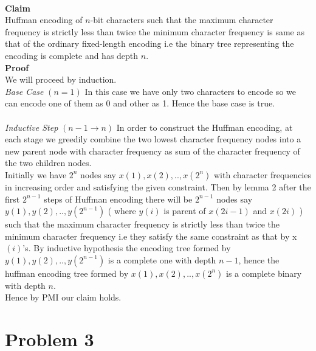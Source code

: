 \documentclass[a4paper]{article}
\begin{document}
\\
\textbf{Claim} \\ Huffman encoding of $n$-bit characters such that the maximum character frequency is strictly less than twice the minimum character frequency is same as that of the ordinary fixed-length encoding i.e the binary tree representing the encoding is complete and has depth $n$. \\
\textbf{Proof} \\
We will proceed by induction. \\
\emph{Base Case} $\left(n=1 \right)$
In this case we have only two characters to encode so we can encode one of them as 0 and other as 1. Hence the base case is true. \\ \\
\emph{Inductive Step} $\left(n-1 \longrightarrow n\right)$ 
 In order to construct the Huffman encoding, at each stage we greedily combine the two lowest character frequency nodes into a new parent node with character frequency as sum of the character frequency of the two children nodes.\\
 Initially we have $2^{n}$ nodes say $x(1),x(2),..,x(2^n)$ with character frequencies in increasing order and satisfying the given constraint. Then by lemma 2 after the first $2^{n-1}$ steps of Huffman encoding there will be $2^{n-1}$ nodes say $y(1),y(2),..,y(2^{n-1})$ ( where $y(i)$ is parent of $x(2i-1)$ and $x(2i)$ ) such that the  maximum  character frequency is strictly less than twice the minimum character frequency i.e they satisfy the same constraint as that by x$(i)$'s. By inductive hypothesis the encoding tree formed by $y(1),y(2),..,y(2^{n-1})$ is a complete one with depth $n-1$, hence the huffman encoding tree formed by $x(1),x(2),..,x(2^n)$ is a complete binary with depth $n$.\\
 Hence by PMI our claim holds.
 
\pagebreak 
 
\section*{Problem 3}
\end{document}
